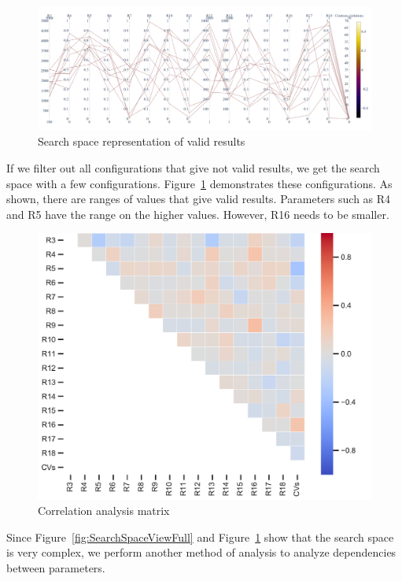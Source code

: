 \begin{figure}
	\centering
	\includegraphics[width=\textwidth]{images/SPEA2_Zero_validity.html.pdf}
	\caption[Search space representation of valid results]{Search space representation of valid results}
	\label{fig:SearchSpaceValid}
\end{figure}

If we filter out all configurations that give not valid results, we get the search space with a few configurations. Figure~\ref{fig:SearchSpaceValid} demonstrates these configurations. As shown, there are ranges of values that give valid results. Parameters such as R4 and R5 have the range on the higher values. However, R16 needs to be smaller.

\begin{figure}
	\centering
	\includegraphics[width=\textwidth]{images/CorrelationAnalysis.pdf}
	\caption[Correlation analysis matrix]{Correlation analysis matrix}
	\label{fig:CorrelationAnalysis}
\end{figure}

Since Figure~\ref{fig:SearchSpaceViewFull} and Figure~\ref{fig:SearchSpaceValid} show that the search space is very complex, we perform another method of analysis to analyze dependencies between parameters.

